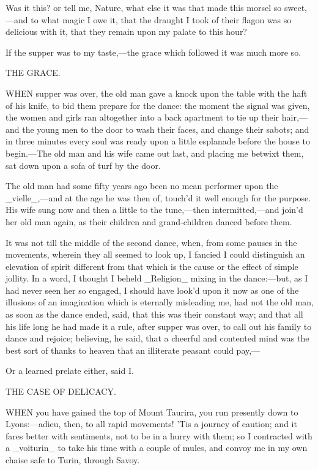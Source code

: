 \documentclass[twoside]{article}
\begin{document}
Was it this? or tell me, Nature, what else it was that made this morsel
so sweet,—and to what magic I owe it, that the draught I took of their
flagon was so delicious with it, that they remain upon my palate to this
hour?

If the supper was to my taste,—the grace which followed it was much more
so.




THE GRACE.


WHEN supper was over, the old man gave a knock upon the table with the
haft of his knife, to bid them prepare for the dance: the moment the
signal was given, the women and girls ran altogether into a back
apartment to tie up their hair,—and the young men to the door to wash
their faces, and change their sabots; and in three minutes every soul was
ready upon a little esplanade before the house to begin.—The old man and
his wife came out last, and placing me betwixt them, sat down upon a sofa
of turf by the door.

The old man had some fifty years ago been no mean performer upon the
_vielle_,—and at the age he was then of, touch’d it well enough for the
purpose.  His wife sung now and then a little to the tune,—then
intermitted,—and join’d her old man again, as their children and
grand-children danced before them.

It was not till the middle of the second dance, when, from some pauses in
the movements, wherein they all seemed to look up, I fancied I could
distinguish an elevation of spirit different from that which is the cause
or the effect of simple jollity.  In a word, I thought I beheld
_Religion_ mixing in the dance:—but, as I had never seen her so engaged,
I should have look’d upon it now as one of the illusions of an
imagination which is eternally misleading me, had not the old man, as
soon as the dance ended, said, that this was their constant way; and that
all his life long he had made it a rule, after supper was over, to call
out his family to dance and rejoice; believing, he said, that a cheerful
and contented mind was the best sort of thanks to heaven that an
illiterate peasant could pay,—

Or a learned prelate either, said I.




THE CASE OF DELICACY.


WHEN you have gained the top of Mount Taurira, you run presently down to
Lyons:—adieu, then, to all rapid movements!  ’Tis a journey of caution;
and it fares better with sentiments, not to be in a hurry with them; so I
contracted with a _voiturin_ to take his time with a couple of mules, and
convoy me in my own chaise safe to Turin, through Savoy.
\end{document}
